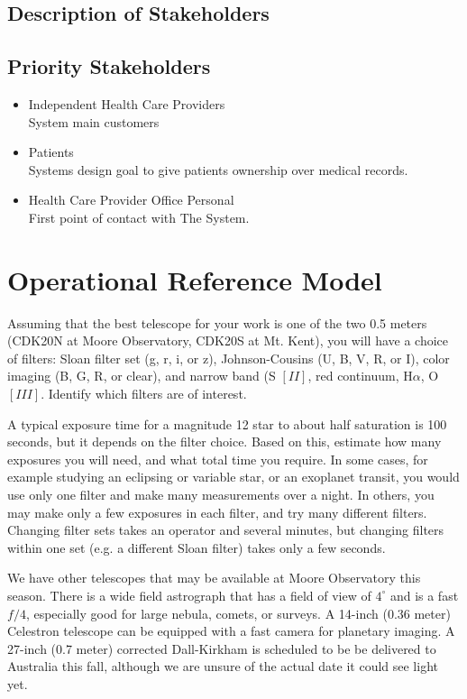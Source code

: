 \documentclass[12pt]{article}
\begin{document}
\subsection{Description of Stakeholders}

\subsection{Priority Stakeholders}
\begin{itemize}
\item Independent Health Care Providers
\\System main customers
\item Patients
\\Systems design goal to give patients ownership over medical records.
\item Health Care Provider Office Personal
\\First point of contact with The System.
\end{itemize}

\section{Operational Reference Model}

Assuming that the best telescope for your work is one of the two 0.5 meters
(CDK20N at Moore Observatory, CDK20S at Mt. Kent), you will have a choice of
filters:  Sloan filter set (g, r, i, or z),  Johnson-Cousins (U, B, V, R, or I),
color imaging (B, G, R, or clear), and narrow band (S $[II]$, red continuum,
H$\alpha$,  O$[III]$.  Identify which filters are of interest.

A typical exposure time for a magnitude 12 star to about half saturation is 100
seconds, but it depends on the filter choice.  Based on this, estimate how many
exposures you will need, and what total time you require.  In some cases, for
example studying an eclipsing or variable star, or an exoplanet transit, you
would use only one filter and make many measurements over a night.  In others,
you may make only a few exposures in each filter, and try many different
filters.   Changing filter sets takes an operator and several minutes, but
changing filters within one set (e.g. a different Sloan filter) takes only a few
seconds.

We have other telescopes that may be available at Moore Observatory this season.
There is a wide field astrograph that has a field of view of $4^\circ$ and is a
fast $f/4$,  especially good for large nebula, comets, or surveys.  A 14-inch
(0.36 meter) Celestron  telescope can be equipped with a fast camera for
planetary imaging.  A 27-inch (0.7 meter)  corrected Dall-Kirkham is scheduled
to be be delivered to Australia this fall, although we are unsure of the actual
date it could see light yet.  
\end{document}
